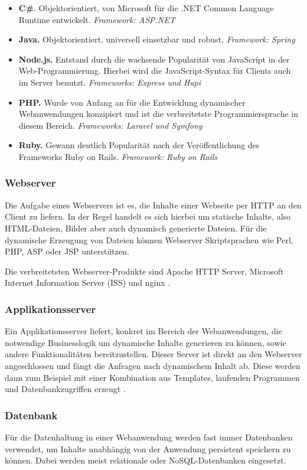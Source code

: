 \begin{itemize}
	\item \textbf{C\#}. Objektorientiert, von Microsoft für die .NET Common Language Runtime entwickelt. \textit{Framework: ASP.NET}
	\item \textbf{Java.} Objektorientiert, universell einsetzbar und robust. \textit{Framework: Spring}
	\item \textbf{Node.js.} Entstand durch die wachsende Popularität von JavaScript in der Web-Programmierung. Hierbei wird die JavaScript-Syntax für Clients auch im Server benutzt. \textit{Frameworks: Express und Hapi}
	\item \textbf{PHP.} Wurde von Anfang an für die Entwicklung dynamischer Webanwendungen konzipiert und ist die verbreitetste Programmiersprache in diesem Bereich. \textit{Frameworks: Laravel und Symfony}
	\item \textbf{Ruby.} Gewann deutlich Popularität nach der Veröffentlichung des Frameworks Ruby on Rails. \textit{Framework: Ruby on Rails}
\end{itemize}

\subsubsection{Webserver}
Die Aufgabe eines Webservers ist es, die Inhalte einer Webseite per \acs{HTTP} an den Client zu liefern. In der Regel handelt es sich hierbei um statische Inhalte, also \acs{HTML}-Dateien, Bilder aber auch dynamisch generierte Dateien.
Für die dynamische Erzeugung von Dateien können Webserver Skriptsprachen wie Perl, PHP, ASP oder JSP unterstützen.

Die verbreitetsten Webserver-Produkte sind Apache \acs{HTTP} Server, Microsoft Internet Information Server (\acs{ISS}) und nginx \cite{Rouse2012}.

\subsubsection{Applikationsserver}
Ein Applikationsserver liefert, konkret im Bereich der Webanwendungen, die notwendige Businesslogik um dynamische Inhalte generieren zu können, sowie andere Funktionalitäten bereitzustellen. Dieser Server ist direkt an den Webserver angeschlossen und fängt die Anfragen nach dynamischem Inhalt ab.
Diese werden dann zum Beispiel mit einer Kombination aus Templates, laufenden Programmen und Datenbankzugriffen erzeugt \cite{ITWissen.info2013}.

\subsubsection{Datenbank}
Für die Datenhaltung in einer Webanwendung werden fast immer Datenbanken verwendet, um Inhalte unabhängig von der Anwendung persistent speichern zu können.
Dabei werden meist relationale oder \acs{NoSQL}-Datenbanken eingesetzt.

